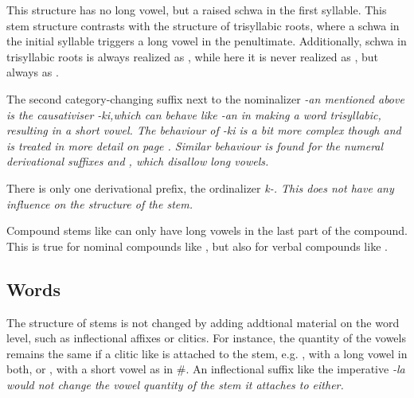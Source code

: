 This structure has no long vowel, but a raised schwa in the first syllable. This stem structure contrasts with the structure of trisyllabic roots, where a schwa in the initial syllable  triggers a long vowel in the penultimate. Additionally, schwa in trisyllabic roots is always realized as , while here it is never realized as \phonet{\E}, but always as .




The second category-changing suffix next to the nominalizer \em -an \em mentioned above is the causativiser \em -ki\ng,\em which can behave like \em -an \em in making a word trisyllabic, resulting in a short vowel. The behaviour of \em -ki\ng{} \em is a bit more complex though and is treated in more detail on page \pageref{page:phon:king}.
Similar behaviour is found for the numeral derivational suffixes  and , which disallow long vowels.

There is only one derivational prefix, the ordinalizer \em k\E-\em. This does not have any influence on the structure of the stem.

Compound stems like  can only have long vowels in the last part of the compound. This is true for nominal compounds like , but also for verbal compounds like .




\subsection{Words}\label{sec:phon:struct:Words}
The structure of stems is not changed by adding addtional material on the word level, such as inflectional affixes or clitics. For instance, the quantity of the vowels remains the same if a clitic like  is attached to the stem, e.g. ,  with a long vowel in both, or , with a short vowel as in \#. An inflectional suffix like the imperative \em -la \em would   not change the vowel quantity of the stem it attaches to either.

